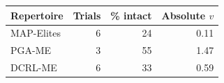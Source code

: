 \begin{tabular}{lrrr}
\toprule
Repertoire & Trials & \% intact & Absolute $v$ \\
\midrule
MAP-Elites & 6 & 24 & 0.11 \\
PGA-ME & 3 & 55 & 1.47 \\
DCRL-ME & 6 & 33 & 0.59 \\
\bottomrule
\end{tabular}
